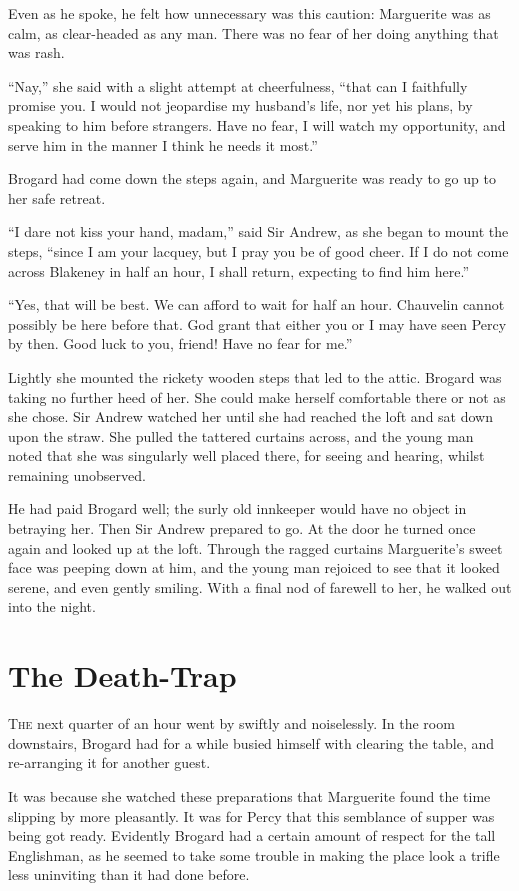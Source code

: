 \documentclass[paper=a5,BCOR=7mm,twoside,DIV=calc,12pt,usegeometry,chapterprefix,endperiod,headings=big]{scrbook}
\begin{document}
Even as he spoke, he felt how unnecessary was this caution: Marguerite was as calm, as clear-headed as any man. There was no fear of her doing anything that was rash.

\enquote{Nay,} she said with a slight attempt at cheerfulness, \enquote{that can I faithfully promise you. I would not jeopardise my husband's life, nor yet his plans, by speaking to him before strangers. Have no fear, I will watch my opportunity, and serve him in the manner I think he needs it most.}

Brogard had come down the steps again, and Marguerite was ready to go up to her safe retreat.

\enquote{I dare not kiss your hand, madam,} said Sir Andrew, as she began to mount the steps, \enquote{since I am your lacquey, but I pray you be of good cheer. If I do not come across Blakeney in half an hour, I shall return, expecting to find him here.}

\enquote{Yes, that will be best. We can afford to wait for half an hour. Chauvelin cannot possibly be here before that. God grant that either you or I may have seen Percy by then. Good luck to you, friend! Have no fear for me.}

Lightly she mounted the rickety wooden steps that led to the attic. Brogard was taking no further heed of her. She could make herself comfortable there or not as she chose. Sir Andrew watched her until she had reached the loft and sat down upon the straw. She pulled the tattered curtains across, and the young man noted that she was singularly well placed there, for seeing and hearing, whilst remaining unobserved.

He had paid Brogard well; the surly old innkeeper would have no object in betraying her. Then Sir Andrew prepared to go. At the door he turned once again and looked up at the loft. Through the ragged curtains Marguerite's sweet face was peeping down at him, and the young man rejoiced to see that it looked serene, and even gently smiling. With a final nod of farewell to her, he walked out into the night.

\chapter{The Death-Trap}
\lettrine[lines=4]{T}{he} next quarter of an hour went by swiftly and noiselessly. In the room downstairs, Brogard had for a while busied himself with clearing the table, and re-arranging it for another guest.

It was because she watched these preparations that Marguerite found the time slipping by more pleasantly. It was for Percy that this semblance of supper was being got ready. Evidently Brogard had a certain amount of respect for the tall Englishman, as he seemed to take some trouble in making the place look a trifle less uninviting than it had done before.
\end{document}
